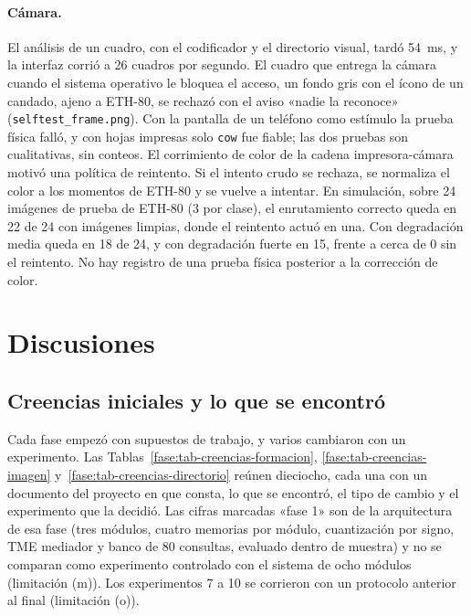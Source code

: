 \paragraph{Cámara.}
El análisis de un cuadro, con el codificador y el directorio visual, tardó 54~ms, y la
interfaz corrió a 26 cuadros por segundo.
El cuadro que entrega la cámara cuando el sistema operativo le bloquea el acceso, un
fondo gris con el ícono de un candado, ajeno a ETH-80, se rechazó con el aviso «nadie la
reconoce» (\texttt{selftest\_frame.png}).
Con la pantalla de un teléfono como estímulo la prueba física falló, y con hojas impresas
solo \texttt{cow} fue fiable; las dos pruebas son cualitativas, sin conteos.
El corrimiento de color de la cadena impresora-cámara motivó una política de reintento.
Si el intento crudo se rechaza, se normaliza el color a los momentos de ETH-80 y se
vuelve a intentar.
En simulación, sobre 24 imágenes de prueba de ETH-80 (3 por clase), el enrutamiento
correcto queda en 22 de 24 con imágenes limpias, donde el reintento actuó en una.
Con degradación media queda en 18 de 24, y con degradación fuerte en 15, frente a cerca
de 0 sin el reintento.
No hay registro de una prueba física posterior a la corrección de color.

\section{Discusiones}
\label{sec:discusion}
\subsection{Creencias iniciales y lo que se encontró}
\label{sec:creencias}

Cada fase empezó con supuestos de trabajo, y varios cambiaron con un experimento.
Las Tablas~\ref{fase:tab-creencias-formacion}, \ref{fase:tab-creencias-imagen}
y~\ref{fase:tab-creencias-directorio} reúnen dieciocho, cada una con un documento del
proyecto en que consta, lo que se encontró, el tipo de cambio y el experimento que la
decidió.
Las cifras marcadas «fase 1» son de la arquitectura de esa fase (tres módulos, cuatro
memorias por módulo, cuantización por signo, TME mediador y banco de 80 consultas,
evaluado dentro de muestra) y no se comparan como experimento controlado con el sistema
de ocho módulos (limitación (m)).
Los experimentos 7 a 10 se corrieron con un protocolo anterior al final (limitación
(o)).

